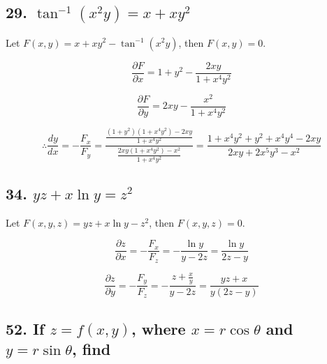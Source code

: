 \documentclass{article}
\begin{document}
    \subsection*{29. $\tan^{-1}(x^2y) = x+xy^2$}

    Let $F(x, y) = x + xy^2 - \tan^{-1}(x^2y)$, then $F(x, y) = 0$.
    
    $$\frac{\partial F}{\partial x} = 1 + y^2 - \frac{2xy}{1+x^4y^2}$$

    $$\frac{\partial F}{\partial y} = 2xy - \frac{x^2}{1+x^4y^2}$$

    $$\therefore \frac{dy}{dx} = -\frac{F_x}{F_y} = \frac{\frac{(1+y^2)(1+x^4y^2)-2xy}{1+x^4y^2}}{\frac{2xy(1+x^4y^2)-x^2}{1+x^4y^2}} = \frac{1+x^4y^2+y^2+x^4y^4-2xy}{2xy+2x^5y^3-x^2}$$

    \subsection*{34. $yz+x\ln y =z^2$}

    Let $F(x, y, z) = yz+x\ln y-z^2$, then $F(x, y, z) = 0$.

    $$\frac{\partial z}{\partial x} = -\frac{F_x}{F_z} = -\frac{\ln y}{y-2z} = \frac{\ln y}{2z-y}$$

    $$\frac{\partial z}{\partial y} = -\frac{F_y}{F_z} = -\frac{z+\frac x y}{y-2z} = \frac{yz+x}{y(2z-y)}$$

    \subsection*{52. If $z = f(x, y)$, where $x=r\cos \theta$ and $y=r \sin \theta$, find}
\end{document}
